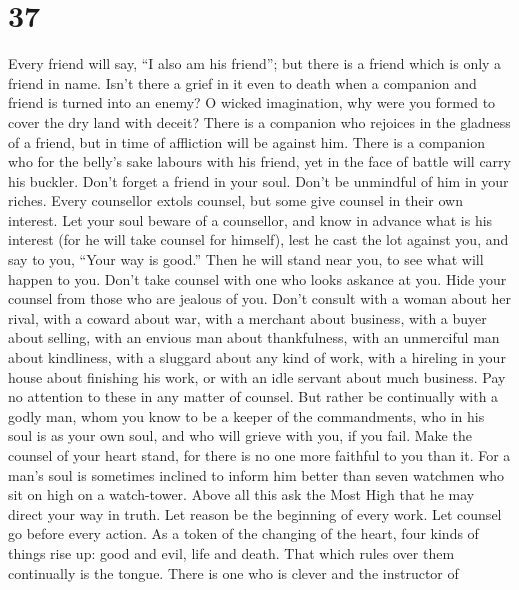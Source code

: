 \hypertarget{section-30}{%
\section{37}\label{section-30}}

 Every friend will say, ``I also am his friend''; but there
is a friend which is only a friend in name.  Isn't there a
grief in it even to death when a companion and friend is turned into an
enemy?  O wicked imagination, why were you formed to cover
the dry land with deceit?  There is a companion who rejoices
in the gladness of a friend, but in time of affliction will be against
him.  There is a companion who for the belly's sake labours
with his friend, yet in the face of battle will carry his buckler.
 Don't forget a friend in your soul. Don't be unmindful of
him in your riches.  Every counsellor extols counsel, but
some give counsel in their own interest.  Let your soul
beware of a counsellor, and know in advance what is his interest (for he
will take counsel for himself), lest he cast the lot against you,
 and say to you, ``Your way is good.'' Then he will stand
near you, to see what will happen to you.  Don't take
counsel with one who looks askance at you. Hide your counsel from those
who are jealous of you.  Don't consult with a woman about
her rival, with a coward about war, with a merchant about business, with
a buyer about selling, with an envious man about thankfulness, with an
unmerciful man about kindliness, with a sluggard about any kind of work,
with a hireling in your house about finishing his work, or with an idle
servant about much business. Pay no attention to these in any matter of
counsel.  But rather be continually with a godly man, whom
you know to be a keeper of the commandments, who in his soul is as your
own soul, and who will grieve with you, if you fail.  Make
the counsel of your heart stand, for there is no one more faithful to
you than it.  For a man's soul is sometimes inclined to
inform him better than seven watchmen who sit on high on a watch-tower.
 Above all this ask the Most High that he may direct your
way in truth.  Let reason be the beginning of every work.
Let counsel go before every action.  As a token of the
changing of the heart,  four kinds of things rise up: good
and evil, life and death. That which rules over them continually is the
tongue.  There is one who is clever and the instructor of
